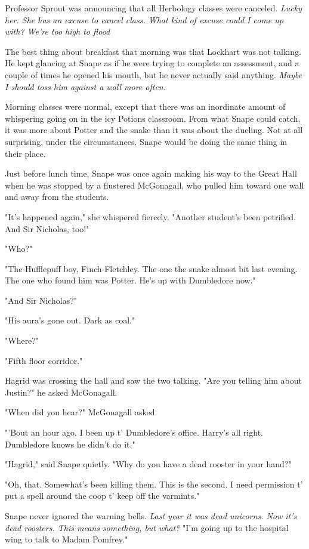 Professor Sprout was announcing that all Herbology classes were canceled. \emph{Lucky her. She has an excuse to cancel class. What kind of excuse could I come up with? We're too high to flood{\el}}

The best thing about breakfast that morning was that Lockhart was not talking. He kept glancing at Snape as if he were trying to complete an assessment, and a couple of times he opened his mouth, but he never actually said anything. \emph{Maybe I should toss him against a wall more often.}

Morning classes were normal, except that there was an inordinate amount of whispering going on in the icy Potions classroom. From what Snape could catch, it was more about Potter and the snake than it was about the dueling. Not at all surprising, under the circumstances. Snape would be doing the same thing in their place.

Just before lunch time, Snape was once again making his way to the Great Hall when he was stopped by a flustered McGonagall, who pulled him toward one wall and away from the students.

"It's happened again," she whispered fiercely. "Another student's been petrified. And Sir Nicholas, too!"

"Who?"

"The Hufflepuff boy, Finch-Fletchley. The one the snake almost bit last evening. The one who found him was Potter. He's up with Dumbledore now."

"And Sir Nicholas?"

"His aura's gone out. Dark as coal."

"Where?"

"Fifth floor corridor."

Hagrid was crossing the hall and saw the two talking. "Are you telling him about Justin?" he asked McGonagall.

"When did you hear?" McGonagall asked.

"'Bout an hour ago. I been up t' Dumbledore's office. Harry's all right. Dumbledore knows he didn't do it."

"Hagrid," said Snape quietly. "Why do you have a dead rooster in your hand?"

"Oh, that. Somewhat's been killing them. This is the second. I need permission t' put a spell around the coop t' keep off the varmints."

Snape never ignored the warning bells. \emph{Last year it was dead unicorns. Now it's dead roosters. This means something, but what?} "I'm going up to the hospital wing to talk to Madam Pomfrey."

